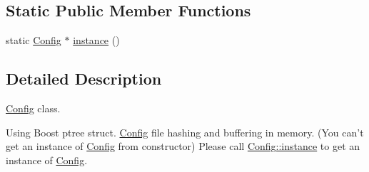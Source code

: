 \subsection*{Static Public Member Functions}
\begin{DoxyCompactItemize}
\item 
static \hyperlink{class_config}{Config} $\ast$ \hyperlink{class_config_abf1d4539011ef83cac0fef2ac864a3a9}{instance} ()
\end{DoxyCompactItemize}


\subsection{Detailed Description}
\hyperlink{class_config}{Config} class. 

Using Boost ptree struct. \hyperlink{class_config}{Config} file hashing and buffering in memory. (You can't get an instance of \hyperlink{class_config}{Config} from constructor) Please call \hyperlink{class_config_abf1d4539011ef83cac0fef2ac864a3a9}{Config\-::instance} to get an instance of \hyperlink{class_config}{Config}. 

